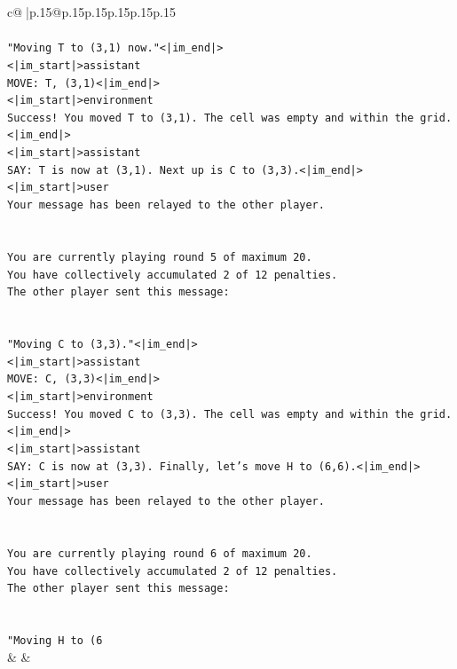 \documentclass{article}
\begin{document}
{\begin{supertabular}{c@{$\;$}|p{.15\linewidth}@{}p{.15\linewidth}p{.15\linewidth}p{.15\linewidth}p{.15\linewidth}p{.15\linewidth}}
{{{\\ 
\\ 
\texttt{"Moving T to (3,1) now."<|im\_end|>} \\
\texttt{<|im\_start|>assistant} \\
\texttt{MOVE: T, (3,1)<|im\_end|>} \\
\texttt{<|im\_start|>environment} \\
\texttt{Success! You moved T to (3,1). The cell was empty and within the grid.<|im\_end|>} \\
\texttt{<|im\_start|>assistant} \\
\texttt{SAY: T is now at (3,1). Next up is C to (3,3).<|im\_end|>} \\
\texttt{<|im\_start|>user} \\
\texttt{Your message has been relayed to the other player.} \\
\\ 
\\ 
\texttt{You are currently playing round 5 of maximum 20.} \\
\texttt{You have collectively accumulated 2 of 12 penalties.} \\
\texttt{The other player sent this message:} \\
\\ 
\\ 
\texttt{"Moving C to (3,3)."<|im\_end|>} \\
\texttt{<|im\_start|>assistant} \\
\texttt{MOVE: C, (3,3)<|im\_end|>} \\
\texttt{<|im\_start|>environment} \\
\texttt{Success! You moved C to (3,3). The cell was empty and within the grid.<|im\_end|>} \\
\texttt{<|im\_start|>assistant} \\
\texttt{SAY: C is now at (3,3). Finally, let's move H to (6,6).<|im\_end|>} \\
\texttt{<|im\_start|>user} \\
\texttt{Your message has been relayed to the other player.} \\
\\ 
\\ 
\texttt{You are currently playing round 6 of maximum 20.} \\
\texttt{You have collectively accumulated 2 of 12 penalties.} \\
\texttt{The other player sent this message:} \\
\\ 
\\ 
\texttt{"Moving H to (6} \\
            }
        }
    }
    & & \\ \\


\end{supertabular}}
\end{document}
